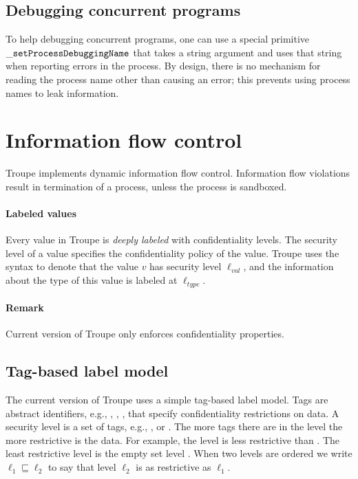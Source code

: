 \subsection{Debugging concurrent programs}
To help debugging concurrent programs, one can use a special primitive ${\mathtt{\_setProcessDebuggingName}}$ that
takes a string argument and uses that string when reporting errors in the process. By design, there is no mechanism
for reading the process name other than causing an error; this prevents using process names to leak information.

\section{Information flow control}
\label{sec:infoflow}
Troupe implements dynamic information flow control. 
%
Information flow violations result in termination of a process,
unless the process is sandboxed. 

\paragraph{Labeled values}
Every value in Troupe is \emph{deeply labeled} with confidentiality
levels. The security level of 
a value specifies the confidentiality policy of the 
value. Troupe uses the syntax  to 
denote that the value $\mathit{v}$ has security level 
$\mathit{\ell_{\mathit{val}}}$, and the information about the type of this value is labeled at $\mathit{\ell_{\mathit{type}}}$.






\paragraph{Remark}
Current version of Troupe only enforces confidentiality 
properties.

\subsection{Tag-based label model}
The current version of Troupe uses a simple tag-based label model.
Tags are abstract identifiers, e.g., , , ,
that specify confidentiality restrictions on data. 
A security level is a set of tags, e.g., 
, or 
.
The more tags there are in the level the more restrictive is the data. 
For example, the level 
 is less restrictive than 
. The least restrictive level is the 
empty set level \lev{}. When two levels are ordered we write 
$\ell_1 \sqsubseteq \ell_2$ to say that level $\ell_2$ is as restrictive 
as $\ell_1$.



